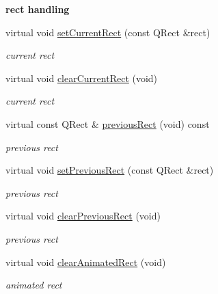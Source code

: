 \begin{Indent}\textbf{ rect handling}\par
\begin{DoxyCompactItemize}
\item 
\mbox{\label{class_tool_bar_data_ad289f2b9f7e174980900f228ec9ef497}} 
virtual void \hyperlink{class_tool_bar_data_ad289f2b9f7e174980900f228ec9ef497}{set\+Current\+Rect} (const Q\+Rect \&rect)
\begin{DoxyCompactList}\small\item\em current rect \end{DoxyCompactList}\item 
\mbox{\label{class_tool_bar_data_a838f7bc535e0b2266cf48ba64b7cb2bd}} 
virtual void \hyperlink{class_tool_bar_data_a838f7bc535e0b2266cf48ba64b7cb2bd}{clear\+Current\+Rect} (void)
\begin{DoxyCompactList}\small\item\em current rect \end{DoxyCompactList}\item 
\mbox{\label{class_tool_bar_data_a2e7c50bf64305d7b64793f619ad8e3a5}} 
virtual const Q\+Rect \& \hyperlink{class_tool_bar_data_a2e7c50bf64305d7b64793f619ad8e3a5}{previous\+Rect} (void) const
\begin{DoxyCompactList}\small\item\em previous rect \end{DoxyCompactList}\item 
\mbox{\label{class_tool_bar_data_a6b8a9e0d6b935b9aceeb03be37a07b22}} 
virtual void \hyperlink{class_tool_bar_data_a6b8a9e0d6b935b9aceeb03be37a07b22}{set\+Previous\+Rect} (const Q\+Rect \&rect)
\begin{DoxyCompactList}\small\item\em previous rect \end{DoxyCompactList}\item 
\mbox{\label{class_tool_bar_data_ab62becd555222e92d266fbddace397ec}} 
virtual void \hyperlink{class_tool_bar_data_ab62becd555222e92d266fbddace397ec}{clear\+Previous\+Rect} (void)
\begin{DoxyCompactList}\small\item\em previous rect \end{DoxyCompactList}\item 
\mbox{\label{class_tool_bar_data_a9ff14ca24fef3e705bf54643cebad6be}} 
virtual void \hyperlink{class_tool_bar_data_a9ff14ca24fef3e705bf54643cebad6be}{clear\+Animated\+Rect} (void)
\begin{DoxyCompactList}\small\item\em animated rect \end{DoxyCompactList}\end{DoxyCompactItemize}
\end{Indent}

